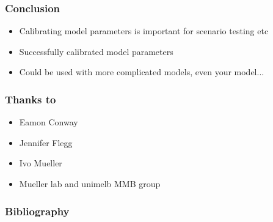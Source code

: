 \documentclass{beamer}
\begin{document}
\begin{frame}
    \frametitle{Conclusion}
    \begin{itemize}
        \item Calibrating model parameters is important for scenario testing etc
        \item Successfully calibrated model parameters
        \item Could be used with more complicated models, even your model...
    \end{itemize}
\end{frame}

\begin{frame}
    \frametitle{Thanks to}
    \begin{itemize}
        \item Eamon Conway
        \item Jennifer Flegg
        \item Ivo Mueller
        \item Mueller lab and unimelb MMB group
    \end{itemize}
\end{frame}

\begin{frame}
    \frametitle{Bibliography}
    \printbibliography
\end{frame}
\end{document}
